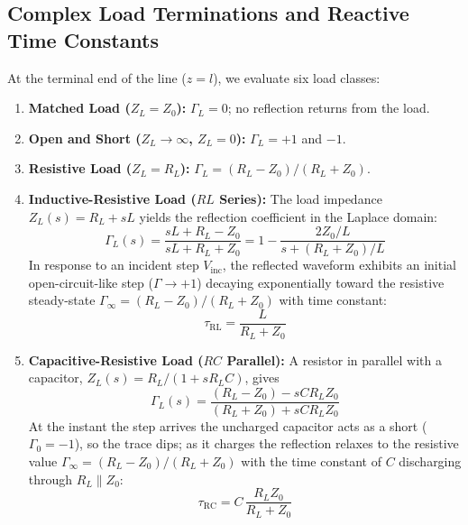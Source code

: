 \subsection{Complex Load Terminations and Reactive Time Constants}
At the terminal end of the line ($z=l$), we evaluate six load classes:
\begin{enumerate}
    \item \textbf{Matched Load ($Z_L = Z_0$):} $\Gamma_L = 0$; no reflection returns from the load.
    \item \textbf{Open and Short ($Z_L \to \infty$, $Z_L = 0$):} $\Gamma_L = +1$ and $-1$.
    \item \textbf{Resistive Load ($Z_L = R_L$):} $\Gamma_L = (R_L - Z_0)/(R_L + Z_0)$.
    \item \textbf{Inductive-Resistive Load ($RL$ Series):} The load impedance $Z_L(s) = R_L + sL$ yields the reflection coefficient in the Laplace domain:
    \begin{equation}
    \Gamma_L(s) = \frac{sL + R_L - Z_0}{sL + R_L + Z_0} = 1 - \frac{2 Z_0 / L}{s + (R_L + Z_0)/L}
    \end{equation}
    In response to an incident step $V_{\mathrm{inc}}$, the reflected waveform exhibits an initial open-circuit-like step ($\Gamma \to +1$) decaying exponentially toward the resistive steady-state $\Gamma_\infty = (R_L - Z_0)/(R_L + Z_0)$ with time constant:
    \begin{equation}
    \tau_{\mathrm{RL}} = \frac{L}{R_L + Z_0}
    \label{eq:tau_rl}
    \end{equation}
    \item \textbf{Capacitive-Resistive Load ($RC$ Parallel):} A resistor in parallel with a capacitor, $Z_L(s) = R_L/(1 + sR_LC)$, gives
    \begin{equation}
    \Gamma_L(s) = \frac{(R_L - Z_0) - s C R_L Z_0}{(R_L + Z_0) + s C R_L Z_0}
    \end{equation}
    At the instant the step arrives the uncharged capacitor acts as a short ($\Gamma_0 = -1$), so the trace dips; as it charges the reflection relaxes to the resistive value $\Gamma_\infty = (R_L - Z_0)/(R_L + Z_0)$ with the time constant of $C$ discharging through $R_L \parallel Z_0$:
    \begin{equation}
    \tau_{\mathrm{RC}} = C \, \frac{R_L Z_0}{R_L + Z_0}
    \label{eq:tau_rc}
    \end{equation}
\end{enumerate}

